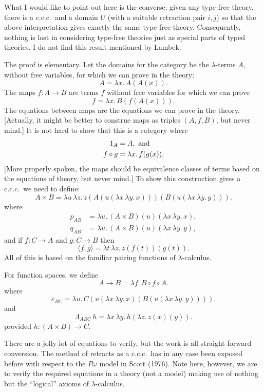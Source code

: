 \documentclass[12pt]{article}
\def\to{\rightarrow}
\def\id{{\textrm 1}}
\def\comp{\circ}
\def\ccc{{c.c.c.}}
\def\ebc{\varepsilon_{BC}}
\def\L{\Lambda}
\def\l{\lambda}
\def\lm#1.#2{\lambda#1.\, #2}
\def\U{U}
\def\lxy{\l x\, \l y . \,}
\def\lmm#1#2.#3{\l #1\, \l #2 . \, #3}
\begin{document}
What I would like to point out here is the converse: given any type-free theory, there is a \ccc\ and a domain $\U$ (with a suitable retraction pair $i,j$) so that the above interpretation gives exactly the same type-free theory. Consequently, nothing is lost in considering type-free theories just as special parts of typed theories. I do not find this result mentioned by Lambek.

The proof is elementary. Let the domains for the category be the $\l$-terms $A$, without free variables, for which we can prove in the theory:
$$
A = \lm{x}. A(A(x)).
$$
The maps $f: A\to B$ are terms $f$ without free variables for which we can prove
$$
f = \lm{x}. B(f(A(x))).
$$
The equations between maps are the equations we can prove in the theory. [Actually, it might be better to construe maps as triples $(A,f,B)$, but never mind.] It is not hard to show that this is a category where
\begin{align*}
\id_A &= A, {\textrm{ and}}\\
f \comp g &= \lm{x}. f(g(x)).
\end{align*}
[More properly spoken, the maps should be equivalence classes of terms based on the equations of theory, but never mind.]
To show this construction gives a \ccc\ we need to define:
$$
A \times B = \lmm{u}{z}.z(A(u(\lxy x))) (B(u(\lxy y))).
$$
where
\begin{align*}
p_{AB} &= \lm{u}. (A \times B)(u)(\lxy x),\\
q_{AB} &= \lm{u}. (A \times B)(u)(\lxy y),
\end{align*}
%
and if $f:C\to A$ and $g: C\to B$ then
$$
\langle f,g \rangle = \lmm{t}{z}.z(f(t))(g(t)).
$$
All of this is based on the familiar pairing functions of $\l$-calculus.

For function spaces, we define
$$
A \to B = \lm{f}. B \comp f \comp A.
$$
where
$$
\ebc = \lm{u}. C(u(\lxy x)(B(u(\lxy y)))).
$$
and
$$
\L_{ABC}\, h = \lxy h(\lm{z}. z(x)(y)).
$$
provided $h: (A \times B) \to C$.

There are a jolly lot of equations to verify, but the work is all straight-forward conversion. The method of retracts as a \ccc\ has in any case been exposed before with respect to the $P\omega$ model in Scott (1976). Note here, however, we are to verify the required equations in a theory (not a model) making use of nothing but the ``logical'' axioms of $\l$-calculus.
\end{document}
